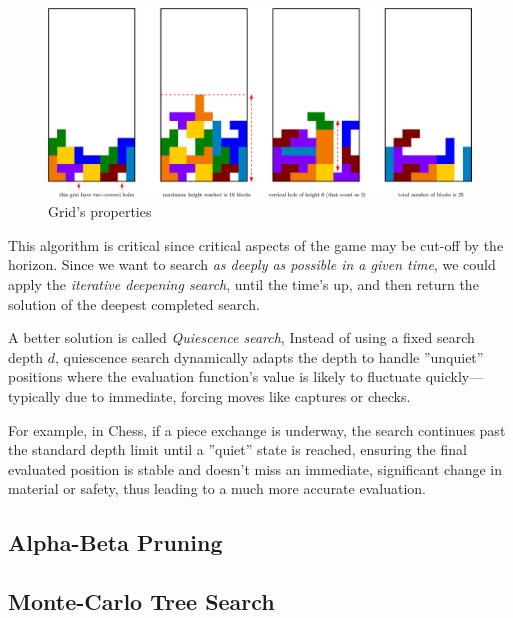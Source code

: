 \documentclass[10pt, letterpaper]{report}
\begin{document}
\begin{figure}[h!]
    \centering
    \includegraphics[width=\textwidth ]{images/grid_properties.eps}
    \caption{Grid's properties}
    \label{fig:tetris}
\end{figure}

This algorithm is critical since critical  aspects of the game may be cut-off by the horizon. Since we want to search \textit{as deeply as possible in a given time}, we could apply the \textit{iterative deepening search}, until the time's up, and then return the solution of the deepest completed search.\bigskip 

A better solution is called \textit{Quiescence search}, Instead of using a fixed search depth $d$, quiescence search dynamically adapts the depth to handle ''unquiet'' positions where the evaluation function's value is likely to fluctuate quickly—typically due to immediate, forcing moves like captures or checks.

For example, in Chess, if a piece exchange is underway, the search continues past the standard depth limit until a ''quiet'' state is reached, ensuring the final evaluated position is stable and doesn't miss an immediate, significant change in material or safety, thus leading to a much more accurate evaluation.

\subsection{Alpha-Beta Pruning}
\subsection{Monte-Carlo Tree Search}
\end{document}

